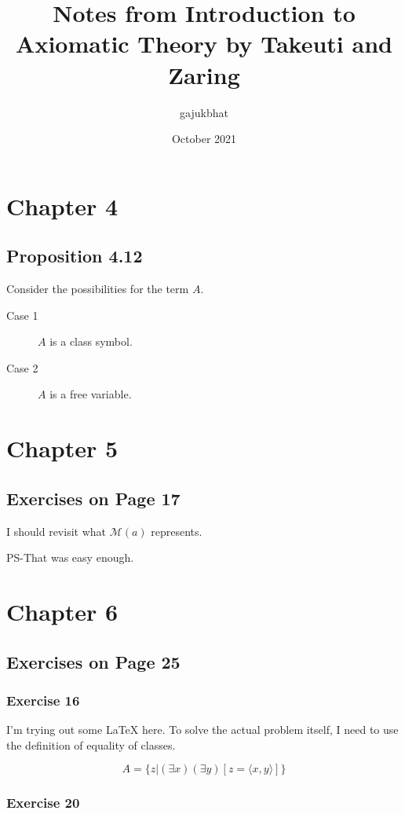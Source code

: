 \documentclass{article}
\title{Notes from Introduction to Axiomatic Theory by Takeuti and Zaring}
\author{gajukbhat}
\date{October 2021}
\begin{document}
\maketitle

\section{Chapter 4}
\subsection{Proposition 4.12}
Consider the possibilities for the term \(A\).
\begin{description}
  \item[Case 1] \(A\) is a class symbol.
  \item[Case 2] \(A\) is a free variable.
\end{description}

\section{Chapter 5}
\subsection{Exercises on Page 17}

I should revisit what \(\mathscr{M}(a)\) represents.

PS-That was easy enough.

\section{Chapter 6}
\subsection{Exercises on Page 25}

\subsubsection{Exercise 16}

I'm trying out some \LaTeX{} here. To solve the actual problem itself, I need to
use the definition of equality of classes.

\[
  A = \{z \vert (\exists x) (\exists y) [z = \langle x, y \rangle]\}
\]

\subsubsection{Exercise 20}
\end{document}
